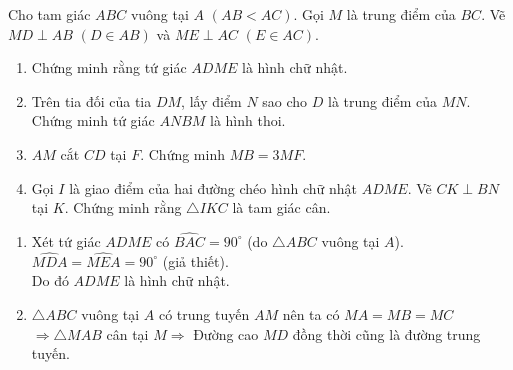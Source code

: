 \begin{bt}%
Cho tam giác $ABC$ vuông tại $A$ $(AB<AC)$. Gọi $M$ là trung điểm của $BC$. Vẽ $MD\perp AB$ $(D\in AB)$ và $ME\perp AC$ $(E\in AC)$.
\begin{enumerate}
\item Chứng minh rằng tứ giác $ADME$ là hình chữ nhật.
\item Trên tia đối của tia $DM$, lấy điểm $N$ sao cho $D$ là trung điểm của $MN$. Chứng minh tứ giác $ANBM$ là hình thoi.
\item $AM$ cắt $CD$ tại $F$. Chứng minh $MB=3MF$.
\item Gọi $I$ là giao điểm của hai đường chéo hình chữ nhật $ADME$. Vẽ $CK\perp BN$ tại $K$. Chứng minh rằng $\triangle IKC$ là tam giác cân.
\end{enumerate}
\loigiai
{
\begin{center}
\end{center}
\begin{enumerate}
\item Xét tứ giác $ADME$ có 
$\widehat{BAC}=90^\circ$ (do $\triangle ABC$ vuông tại $A$).\\
$\widehat{MDA}=\widehat{MEA}=90^\circ$ (giả thiết).\\
Do đó $ADME$ là hình chữ nhật.
\item $\triangle ABC$ vuông tại $A$ có trung tuyến $AM$ nên ta có $MA=MB=MC$\\$\Rightarrow \triangle MAB$ cân tại $M\Rightarrow$ Đường cao $MD$ đồng thời cũng là đường trung tuyến.\\

\end{enumerate}}
\end{bt}
